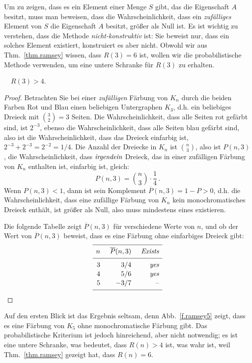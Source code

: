 Um zu zeigen, dass es ein Element einer Menge $S$ gibt, das die Eigenschaft $A$ besitzt, muss man beweisen, dass die Wahrscheinlichkeit, dass ein \emph{zufälliges} Element von $S$ die Eigenschaft $A$ besitzt, größer als Null ist. Es ist wichtig zu verstehen, dass die Methode \emph{nicht-konstruktiv} ist: Sie beweist nur, dass ein solches Element existiert, konstruiert es aber nicht. Obwohl wir aus Thm.~\ref{thm.ramsey} wissen, dass $R(3)=6$ ist, wollen wir die probabilistische Methode verwenden, um eine untere Schranke für $R(3)$ zu erhalten.

\begin{theorem}[Erd\H{o}s]
$\quad R(3) > 4$.
\end{theorem}
\begin{proof}
Betrachten Sie bei einer \emph{zufälligen} Färbung von $K_n$ durch die beiden Farben Rot und Blau einen beliebigen Untergraphen $K_3$, d.h. ein beliebiges Dreieck mit $\binom{3}{2}=3$ Seiten. Die Wahrscheinlichkeit, dass alle Seiten rot gefärbt sind, ist $2^{-3}$, ebenso die Wahrscheinlichkeit, dass alle Seiten blau gefärbt sind, also ist die Wahrscheinlichkeit, dass das Dreieck einfarbig ist, $2^{-3}+2^{-3}=2^{-2}=1/4$. Die Anzahl der Dreiecke in $K_n$ ist $\binom{n}{3}$, also ist $P(n,3)$, die Wahrscheinlichkeit, dass $\emph{irgendein}$ Dreieck, das in einer zufälligen Färbung von $K_n$ enthalten ist, einfarbig ist, gleich:
\[
P(n,3)=\binom{n}{3}\cdot \frac{1}{4}\,.
\]
Wenn $P(n,3)<1$, dann ist sein Komplement $\overline{P}(n,3)=1-P>0$, d.h. die Wahrscheinlichkeit, dass eine zufällige Färbung von $K_n$ kein monochromatisches Dreieck enthält, ist größer als Null, also muss mindestens eines existieren.

Die folgende Tabelle zeigt $\overline{P}(n,3)$ für verschiedene Werte von $n$, und ob der Wert von $\overline{P}(n,3)$ beweist, dass es eine Färbung ohne einfarbiges Dreieck gibt:
\[
\renewcommand*{\arraystretch}{1.1}
\begin{array}{r@{\hspace{5mm}}r@{\hspace{5mm}}r}
\hline
\noalign{\smallskip}
n & \overline{P}(n,3) & \textit{Exists}\\
\noalign{\smallskip}\hline\noalign{\smallskip}
3 & 3/4 & \textit{yes} \\
4 & 5/6 & \textit{yes}\\
5 & -3/7 & \textrm{--}\\
\noalign{\smallskip}
 \hline
 \end{array}
\]
\end{proof}
Auf den ersten Blick ist das Ergebnis seltsam, denn Abb.~\ref{f.ramsey5} zeigt, dass es eine Färbung von $K_5$ ohne monochromatische Färbung gibt. Das probabilistische Kriterium ist jedoch hinreichend, aber nicht notwendig; es ist eine untere Schranke, was bedeutet, dass $R(n)>4$ ist, was wahr ist, weil Thm.~\ref{thm.ramsey} gezeigt hat, dass $R(n)=6$.

